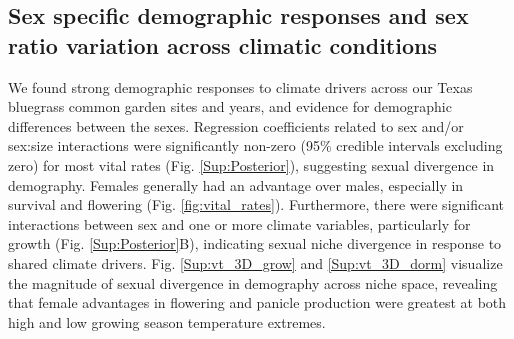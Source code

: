 \documentclass[12pt]{article}\usepackage[]{graphicx}\usepackage[dvipsnames]{xcolor}
\newcommand{\tom}[2]{{\color{red}{#1}}\footnote{\textit{\color{red}{#2}}}}
\begin{document}
\subsection*{Sex specific demographic responses and sex ratio variation across climatic conditions}
We found strong demographic responses to climate drivers across our Texas bluegrass common garden sites and years, and evidence for demographic differences between the sexes. 
Regression coefficients related to sex and/or sex:size interactions were significantly non-zero (95\% credible intervals excluding zero) for most vital rates (Fig. \ref{Sup:Posterior}), suggesting sexual divergence in demography. 
Females generally had an advantage over males, especially in survival and flowering (Fig. \ref{fig:vital_rates}). 
Furthermore, there were significant interactions between sex and one or more climate variables, particularly for growth (Fig. \ref{Sup:Posterior}B), indicating sexual niche divergence in response to shared climate drivers.  
Fig. \ref{Sup:vt_3D_grow} and \ref{Sup:vt_3D_dorm} visualize the magnitude of sexual divergence in demography across niche space, revealing that female advantages in flowering and panicle production were greatest at both high and low growing season temperature extremes. 

\end{document}
